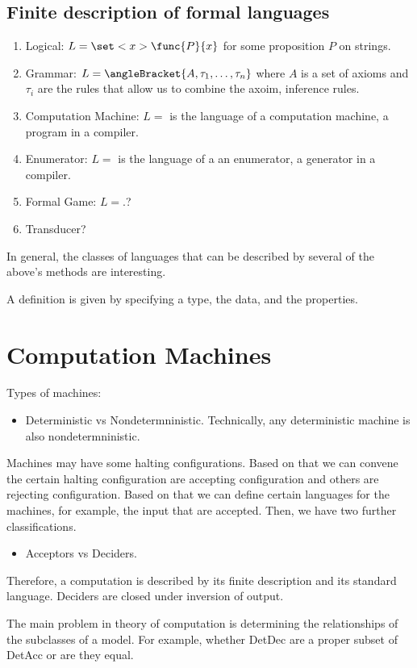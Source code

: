 \subsection{Finite description of formal languages}
\begin{enumerate}
    \item Logical: \(L = \set<x>{\func{P}{x}}\) for some proposition \(P\) on strings.
    \item Grammar: \(L = \angleBracket{A,\tau_1, \dots, \tau_n}\) where \(A\) is a set of axioms and \(\tau_i\) are the rules that allow us to combine the axoim, inference rules.
    \item Computation Machine: \(L = \) is the language of a computation machine, a program in a compiler.
    \item Enumerator: \(L = \) is the language of a an enumerator, a generator in a compiler.
    \item Formal Game: \(L = \).?
    \item Transducer?
\end{enumerate}
In general, the classes of languages that can be described by several of the above's methods are interesting.

A definition is given by specifying a type, the data, and the properties.

\section{Computation Machines}
Types of machines:
\begin{itemize}
    \item Deterministic vs Nondetermninistic. Technically, any deterministic machine is also nondetermninistic.
\end{itemize}
Machines may have some halting configurations. Based on that we can convene the certain halting configuration are accepting configuration and others are rejecting configuration. Based on that we can define certain languages for the machines, for example, the input that are accepted. Then, we have two further classifications.
\begin{itemize}
    \item Acceptors vs Deciders.
\end{itemize}

Therefore, a computation is described by its finite description and its standard language.
Deciders are closed under inversion of output.

The main problem in theory of computation is determining the relationships of the subclasses of a model. For example, whether DetDec are a proper subset of DetAcc or are they equal. 


